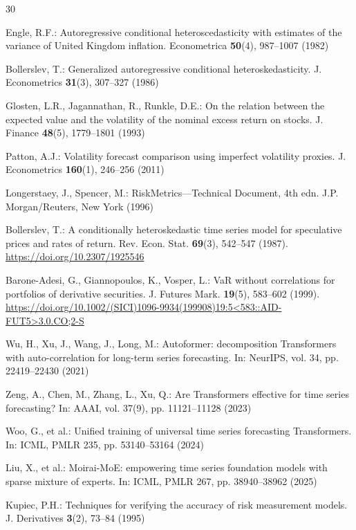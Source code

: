 \documentclass[runningheads]{llncs}
\begin{document}
\begin{thebibliography}{30}

Engle, R.F.: Autoregressive conditional heteroscedasticity with
estimates of the variance of United Kingdom inflation.
Econometrica \textbf{50}(4), 987--1007 (1982)

Bollerslev, T.: Generalized autoregressive conditional
heteroskedasticity. J. Econometrics \textbf{31}(3), 307--327 (1986)

Glosten, L.R., Jagannathan, R., Runkle, D.E.: On the relation between
the expected value and the volatility of the nominal excess return on
stocks. J. Finance \textbf{48}(5), 1779--1801 (1993)

Patton, A.J.: Volatility forecast comparison using imperfect volatility
proxies. J. Econometrics \textbf{160}(1), 246--256 (2011)

Longerstaey, J., Spencer, M.: RiskMetrics---Technical Document,
4th edn. J.P. Morgan/Reuters, New York (1996)

Bollerslev, T.: A conditionally heteroskedastic time series model for
speculative prices and rates of return. Rev. Econ. Stat.
\textbf{69}(3), 542--547 (1987).
\url{https://doi.org/10.2307/1925546}

Barone-Adesi, G., Giannopoulos, K., Vosper, L.: VaR without
correlations for portfolios of derivative securities.
J. Futures Mark. \textbf{19}(5), 583--602 (1999).
\url{https://doi.org/10.1002/(SICI)1096-9934(199908)19:5<583::AID-FUT5>3.0.CO;2-S}

Wu, H., Xu, J., Wang, J., Long, M.: Autoformer: decomposition
Transformers with auto-correlation for long-term series forecasting.
In: NeurIPS, vol. 34, pp. 22419--22430 (2021)

Zeng, A., Chen, M., Zhang, L., Xu, Q.: Are Transformers effective for
time series forecasting? In: AAAI, vol. 37(9), pp. 11121--11128 (2023)

Woo, G., et al.: Unified training of universal time series forecasting
Transformers. In: ICML, PMLR 235, pp. 53140--53164 (2024)

Liu, X., et al.: Moirai-MoE: empowering time series foundation models
with sparse mixture of experts. In: ICML, PMLR 267,
pp. 38940--38962 (2025)

Kupiec, P.H.: Techniques for verifying the accuracy of risk measurement
models. J. Derivatives \textbf{3}(2), 73--84 (1995)


\end{thebibliography}
\end{document}

